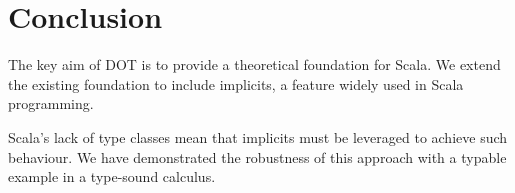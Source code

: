 \section{Conclusion}

The key aim of DOT is to provide a theoretical foundation for Scala. We extend
the existing foundation to include implicits, a feature widely used in Scala
programming.

Scala's lack of type classes mean that implicits must be leveraged to achieve
such behaviour. We have demonstrated the robustness of this approach with a
typable example in a type-sound calculus.
